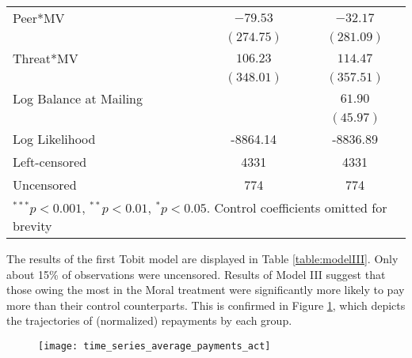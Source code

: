 \documentclass[12pt,titlepage]{article}
\begin{document}
\begin{table}[htbp]
\begin{center}
\begin{tabular}{l c c }
Peer*MV                & $-79.53$          & $-32.17$          \\
                       & $(274.75)$        & $(281.09)$        \\
Threat*MV              & $106.23$          & $114.47$          \\
                       & $(348.01)$        & $(357.51)$        \\
Log Balance at Mailing &                   & $61.90$           \\
                       &                   & $(45.97)$         \\
\hline
Log Likelihood         & -8864.14          & -8836.89          \\
Left-censored          & 4331              & 4331              \\
Uncensored             & 774               & 774               \\
\hline
\multicolumn{3}{l}{\scriptsize{$^{***}p<0.001$, $^{**}p<0.01$, $^*p<0.05$. Control coefficients omitted for brevity}}
\end{tabular}
\end{center}
\end{table}

The results of the first Tobit model are displayed in Table
\ref{table:modelIII}.  Only about 15\% of observations were
uncensored. Results of Model III suggest that those owing the most in
the Moral treatment were significantly more likely to pay more than
their control counterparts. This is confirmed in Figure
\ref{repay_quart_act}, which depicts the trajectories of (normalized)
repayments by each group.

\begin{figure}[htbp]
\begin{center}
\caption{}\label{repay_quart_act}
\texttt{[image: time\_series\_average\_payments\_act]}
\par\end{center}
\end{figure}
\end{document}
